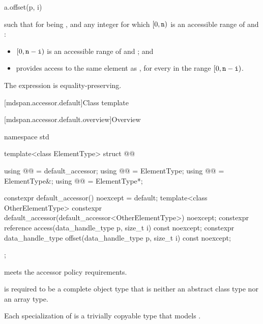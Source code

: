 \begin{itemdecl}
a.offset(p, i)
\end{itemdecl}

\begin{itemdescr}
\pnum
\result
{}

\pnum
\returns
{} such that for  being , and
any integer  for which $[0, \tcode{n})$ is
an accessible range of  and :
\begin{itemize}
\item
$[0, \tcode{n} - \tcode{i})$ is an accessible range of  and ; and
\item
{} provides access to
the same element as ,
for every  in the range $[0, \tcode{n} - \tcode{i})$.
\end{itemize}

\pnum
\remarks
The expression is equality-preserving.
\end{itemdescr}

[mdspan.accessor.default]{Class template }

[mdspan.accessor.default.overview]{Overview}

\begin{codeblock}
namespace std {
  template<class ElementType>
  struct @@ {
    using @@ = default_accessor;
    using @@ = ElementType;
    using @@ = ElementType&;
    using @@ = ElementType*;

    constexpr default_accessor() noexcept = default;
    template<class OtherElementType>
      constexpr default_accessor(default_accessor<OtherElementType>) noexcept;
    constexpr reference access(data_handle_type p, size_t i) const noexcept;
    constexpr data_handle_type offset(data_handle_type p, size_t i) const noexcept;
  };
}
\end{codeblock}

\pnum
{} meets the accessor policy requirements.

\pnum
{} is required to be a complete object type
that is neither an abstract class type nor an array type.

\pnum
Each specialization of  is
a trivially copyable type that models .

